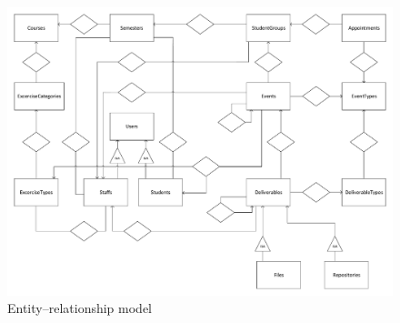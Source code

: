 \begin{landscape}
	
	\begin{figure}[!htbp]
		\centering
		\includegraphics[width=1.3\textheight]{figures/ER.pdf}
		\caption[Entity–relationship model]{Entity–relationship model}
		\label{fig:er}
	\end{figure}
\end{landscape}




